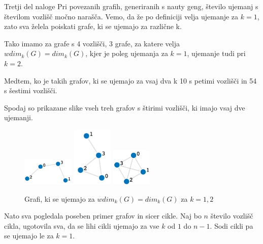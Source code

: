 \documentclass[12pt,a4paper]{amsart}
\makeatletter
\renewcommand\subsection{\@startsection{subsection}{2}%
  \z@{.5\linespacing\@plus.7\linespacing}{.5\linespacing}%
  {\normalfont\scshape}}
\theoremstyle{plain} %
\makeatother
\begin{document}
\bigskip

\subsection{Tretji del naloge}
Pri povezanih grafih, generiranih s nauty geng, število ujemanj s številom vozlišč močno narašča. 
Vemo, da že po definiciji velja ujemanje za $k = 1$, zato sva želela poiskati grafe, ki se ujemajo za različne k.

Tako imamo za grafe s 4 vozlišči, 3 grafe, za katere velja $wdim_k(G) = dim_k(G)$, kjer je poleg ujemanja za $k = 1$, 
ujemanje tudi pri $k = 2$.

Medtem, ko je takih grafov, ki se ujemajo za vsaj dva k 10 s petimi vozlišči in 54 s šestimi vozlišči. 

\bigskip

Spodaj so prikazane slike vseh treh grafov s štirimi vozlišči, ki imajo vsaj dve ujemanji.

\bigskip
\begin{figure}[h]
    \centering
    \includegraphics[width=0.22\textwidth]{slike/naloga3_12.png}
    \includegraphics[width=0.17\textwidth]{slike/naloga3_23.png}
    \includegraphics[width=0.17\textwidth]{slike/naloga3_34.png}
    \caption{Grafi, ki se ujemajo za $wdim_k(G)=dim_k(G)$ za $k = 1,2$}
    \label{fig:slika1}
\end{figure}

\bigskip

Nato sva pogledala poseben primer grafov in sicer cikle.
Naj bo $n$ število vozlišč cikla, ugotovila sva, da se lihi cikli ujemajo za vse $k$ od $1$ do $n - 1$.
Sodi cikli pa se ujemajo le za $k = 1$. 
\end{document}
